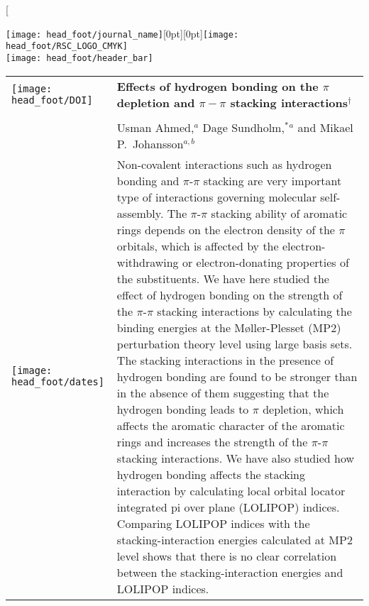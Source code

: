 \documentclass[twoside,twocolumn,9pt]{article}
\begin{document}
\twocolumn[
  \begin{@twocolumnfalse}
{\texttt{[image: head\_foot/journal\_name]}\hfill\raisebox{0pt}[0pt][0pt]{\texttt{[image: head\_foot/RSC\_LOGO\_CMYK]}}\\[1ex]
\texttt{[image: head\_foot/header\_bar]}}\par
\vspace{1em}
\sffamily
\begin{tabular}{m{4.5cm} p{13.5cm} }

\texttt{[image: head\_foot/DOI]} & \noindent\LARGE{\bf Effects of hydrogen bonding on the $\pi$ depletion and $\pi-\pi$ stacking interactions$^\dag$
} \\%
\vspace{0.3cm} & \vspace{0.3cm} \\

 & \noindent\large{Usman Ahmed,\textit{$^{a}$} Dage Sundholm,$^{\ast}$\textit{$^{a}$} and Mikael P.\ Johansson\textit{$^{a,b}$}} \\%



\texttt{[image: head\_foot/dates]} & \noindent\normalsize{Non-covalent
interactions such as hydrogen bonding and $\pi$-$\pi$ stacking are very
important type of interactions governing molecular self-assembly.  The
$\pi$-$\pi$ stacking ability of aromatic rings depends on the electron density
of the $\pi$ orbitals, which is affected by the electron-withdrawing or
electron-donating properties of the substituents. We have here studied the
effect of hydrogen bonding on the strength of the $\pi$-$\pi$ stacking
interactions by calculating the binding energies at the
M{\o}ller-Plesset (MP2) perturbation theory level using large
basis sets.  The stacking interactions in the presence of hydrogen bonding are
found to be stronger than in the absence of them suggesting that the hydrogen
bonding leads to $\pi$ depletion, which affects the aromatic character of the
aromatic rings and increases the strength of the $\pi$-$\pi$ stacking
interactions.  We have also studied how hydrogen bonding affects the stacking
interaction by calculating local orbital locator integrated pi over plane
(LOLIPOP) indices.
Comparing LOLIPOP indices with the stacking-interaction energies calculated at
MP2 level shows that there is no clear correlation between the
stacking-interaction energies and LOLIPOP indices.}

\end{tabular}

 \end{@twocolumnfalse} \vspace{0.6cm}
\end{document}
